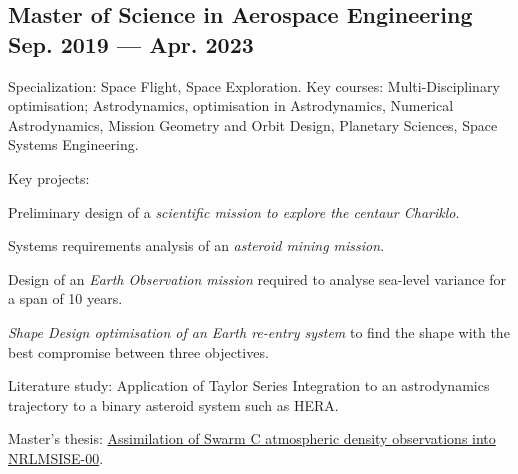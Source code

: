 


\subsection{{Master of Science in Aerospace Engineering} \hfill Sep. 2019 --- Apr. 2023 }
\begin{zitemize}
\item Specialization: Space Flight, Space Exploration. Key courses: Multi-Disciplinary optimisation; Astrodynamics, optimisation in Astrodynamics, Numerical Astrodynamics, Mission Geometry and Orbit Design, Planetary Sciences, Space Systems Engineering. 
\item Key projects: \begin{zitemize}
\item Preliminary design of a \textit{scientific mission to explore the centaur Chariklo}.
\item Systems requirements analysis of an \textit{asteroid mining mission}.%
\item Design of an \textit{Earth Observation mission} required to analyse sea-level variance for a span of 10 years.
\item \textit{Shape Design optimisation of an Earth re-entry system} to find the shape with the best compromise between three objectives. %
\end{zitemize}
\item Literature study: Application of Taylor Series Integration to an astrodynamics trajectory to a binary asteroid system such as HERA. 
\item Master's thesis: \href{https://repository.tudelft.nl/islandora/object/uuid:f472201e-0e32-4b9e-8aa3-04521908396a}{Assimilation of Swarm C atmospheric density observations into NRLMSISE-00}.

\end{zitemize}
